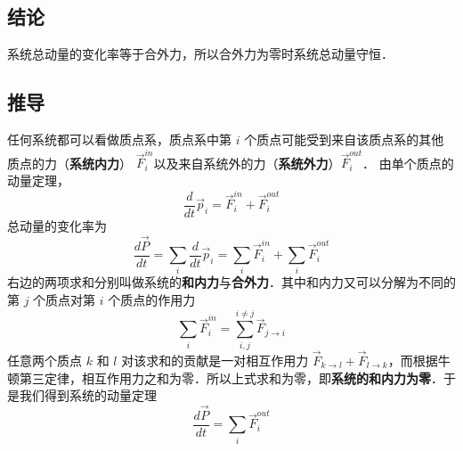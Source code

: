 
\subsection{结论}
系统总动量的变化率等于合外力，所以合外力为零时系统总动量守恒．

\subsection{推导}
任何系统都可以看做质点系，质点系中第 $i$ 个质点可能受到来自该质点系的其他质点的力（\textbf{系统内力}） $\vec F_i^{in}$以及来自系统外的力（\textbf{系统外力}）$\vec F_i^{out}$． 由单个质点的动量定理，%
\begin{equation}
\frac{d}{{dt}}{\vec p_i} = \vec F_i^{in} + \vec F_i^{out}
\end{equation}
总动量的变化率为
\begin{equation}
\frac{{d\vec P}}{{dt}} = \sum\limits_i {\frac{d}{{dt}}{{\vec p}_i}}  = \sum\limits_i {\vec F_i^{in}}  + \sum\limits_i {\vec F_i^{out}}
\end{equation}
右边的两项求和分别叫做系统的\textbf{和内力}与\textbf{合外力}．其中和内力又可以分解为不同的第 $j$ 个质点对第 $i$ 个质点的作用力
\begin{equation}
\sum\limits_i {\vec F_i^{in}}  = \sum\limits_{i,j}^{i \ne j} {{{\vec F}_{j \to i}}}
\end{equation}
任意两个质点 $k$ 和 $l$ 对该求和的贡献是一对相互作用力 ${\vec F_{k \to l}} + {\vec F_{l \to k}}$，而根据牛顿第三定律，相互作用力之和为零．所以上式求和为零，即\textbf{系统的和内力为零}．于是我们得到系统的动量定理
\begin{equation}
\frac{{d\vec P}}{{dt}} = \sum\limits_i {\vec F_i^{out}} 
\end{equation}

